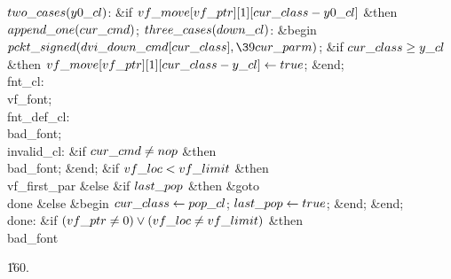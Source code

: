 \4$\\{two\_cases}(\\{y0\_cl})$: \&{if} $\\{vf\_move}[\\{vf\_ptr}][1][\\{cur%
\_class}-\\{y0\_cl}]$ \1\&{then}\5
$\\{append\_one}(\\{cur\_cmd})$;\2\6
\4$\\{three\_cases}(\\{down\_cl})$: \&{begin} $\\{pckt\_signed}(\\{dvi%
\_down\_cmd}[\\{cur\_class}],\39\\{cur\_parm})$;\6
\&{if} $\\{cur\_class}\ge\\{y\_cl}$ \1\&{then}\5
$\\{vf\_move}[\\{vf\_ptr}][1][\\{cur\_class}-\\{y\_cl}]\gets\\{true}$;\2\6
\&{end};\6
\4\\{fnt\_cl}: \\{vf\_font};\6
\4\\{fnt\_def\_cl}: \\{bad\_font};\6
\4\\{invalid\_cl}: \&{if} $\\{cur\_cmd}\ne\\{nop}$ \1\&{then}\5
\\{bad\_font};\2\2\6
\&{end};\6
\&{if} $\\{vf\_loc}<\\{vf\_limit}$ \1\&{then}\5
\\{vf\_first\_par}\6
\4\&{else} \&{if} $\\{last\_pop}$ \1\&{then}\5
\&{goto} \\{done}\6
\4\&{else} \&{begin} $\\{cur\_class}\gets\\{pop\_cl}$;\5
$\\{last\_pop}\gets\\{true}$;\6
\&{end};\2\2\6
\&{end};\2\6
\4\\{done}: \&{if} $(\\{vf\_ptr}\ne0)\lor(\\{vf\_loc}\ne\\{vf\_limit})$ \1%
\&{then}\5
\\{bad\_font}\2\par
\U160.\fi

